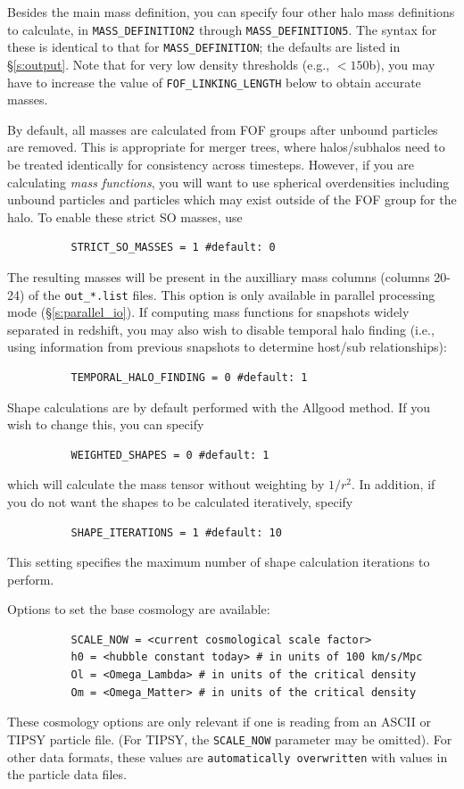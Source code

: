 \documentclass[12pt]{article}
\begin{document}
      Besides the main mass definition, you can specify four other halo mass definitions to calculate,
      in \texttt{MASS\_DEFINITION2} through \texttt{MASS\_DEFINITION5}.  The syntax for these is
      identical to that for \texttt{MASS\_DEFINITION}; the defaults are listed in \S \ref{s:output}.  Note that
      for very low density thresholds (e.g., $<150$b), you may have to increase the value of \texttt{FOF\_LINKING\_LENGTH} below to obtain accurate masses.

      By default, all masses are calculated from FOF groups after
      unbound particles are removed.  This is appropriate for merger trees,
      where halos/subhalos need to be treated identically for consistency
      across timesteps.  However, if you are calculating \textit{mass functions},
      you will want to use spherical overdensities including unbound particles
      and particles which may exist outside of the FOF group for the halo.
      To enable these strict SO masses, use
\begin{verbatim}
          STRICT_SO_MASSES = 1 #default: 0
\end{verbatim}
      The resulting masses will be present in the auxilliary mass columns
      (columns 20-24) of the \texttt{out\_*.list} files.  This option is only available in parallel processing mode (\S \ref{s:parallel_io}).  If computing mass functions for snapshots widely separated in redshift, you may also wish to disable temporal halo finding (i.e., using information from previous snapshots to determine host/sub relationships):
\begin{verbatim}
          TEMPORAL_HALO_FINDING = 0 #default: 1
\end{verbatim}

	Shape calculations are by default performed with the Allgood method.  If you wish to change this, you can specify
\begin{verbatim}
          WEIGHTED_SHAPES = 0 #default: 1
\end{verbatim}
	which will calculate the mass tensor without weighting by $1/r^2$.  In addition, if you do not want the shapes to be calculated iteratively, specify
\begin{verbatim}
          SHAPE_ITERATIONS = 1 #default: 10
\end{verbatim}
	This setting specifies the maximum number of shape calculation iterations to perform.

      Options to set the base cosmology are available:
\begin{verbatim}
          SCALE_NOW = <current cosmological scale factor>
          h0 = <hubble constant today> # in units of 100 km/s/Mpc
          Ol = <Omega_Lambda> # in units of the critical density
          Om = <Omega_Matter> # in units of the critical density
\end{verbatim}
      These cosmology options are only relevant if one is reading from an ASCII
      or TIPSY particle file.  (For TIPSY, the \texttt{SCALE\_NOW} parameter may be
      omitted).  For other data formats, these values are \texttt{automatically
      overwritten} with values in the particle data files.
\end{document}
